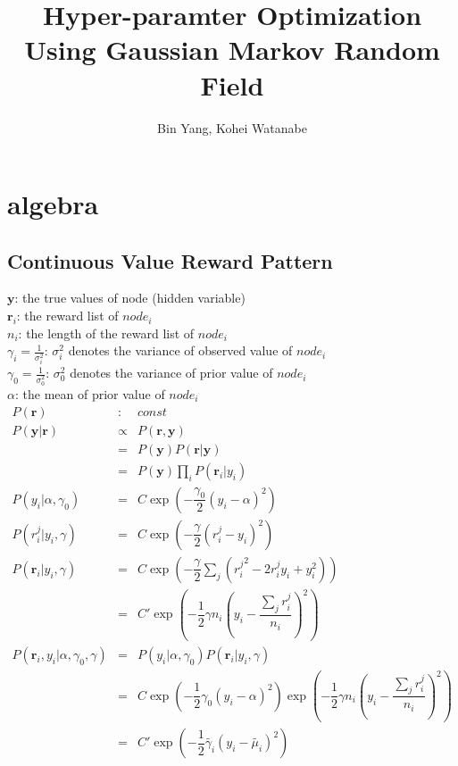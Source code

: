 \documentclass[platex, a4paper]{jsarticle}
\begin{document}
\title{Hyper-paramter Optimization \\ Using Gaussian Markov Random Field}
\author{Bin Yang, Kohei Watanabe}
\maketitle

\section{algebra}

\subsection{Continuous Value Reward Pattern}

$\bm{y}$: the true values of node (hidden variable) \\
$\bm{r}_i$: the reward list of $node_i$ \\
$n_i$: the length of the reward list of $node_i$ \\
$\gamma_i=\frac{1}{\sigma_i^2}$: $\sigma_i^2$ denotes the variance of observed value of $node_i$ \\
$\gamma_0=\frac{1}{\sigma_0^2}$: $\sigma_0^2$ denotes the variance of prior value of $node_i$ \\
$\alpha$: the mean of prior value of $node_i$ \\

\begin{eqnarray}
  P(\bm{r}) &:& const \\
  P\left( \bm{y} |\bm{r}\right) &\propto&  P\left( \bm{r} ,\bm{y}\right) \\
    &=& P\left( \bm{y} \right) P\left( \bm{r} |\bm{y}\right) \\
    &=& P\left( \bm{y} \right) \prod_i P\left( \bm{r}_i |y_i \right) \\
  P\left( y_{i} | \alpha, \gamma_0 \right) &=& C\exp \left( -\dfrac {\gamma_0} {2} \left( y_{i}-\alpha \right) ^{2}\right) \\
  P(r_{i}^{j} | y_{i}, \gamma) &=& C\exp \left( -\dfrac {\gamma} {2}\left( r_{i}^{j}-y_{i}\right) ^{2}\right) \\
  P\left( \bm{r}_i | y_i, \gamma \right) &=& C\exp \left( -\dfrac {\gamma} {2}\sum _{j}\left( {r_{i}^{j}}^2-2r_{i}^{j}y_{i}+y_{i}^{2}\right) \right) \\
    &=& C'\exp \left( -\dfrac {1} {2}\gamma n_{i}\left( y_{i}-\dfrac {\sum _{j}r_{i}^{j}} {n_{i}}\right) ^{2}\right) \\
  P\left( \bm{r}_i ,y_i | \alpha, \gamma_0, \gamma \right) &=& P\left( y_i | \alpha, \gamma_0 \right) P\left( \bm{r}_i | y_i, \gamma \right) \\
    &=& C\exp \left( -\dfrac {1} {2} \gamma_0 \left( y_{i}-\alpha \right) ^{2}\right)
    \exp \left( -\dfrac {1} {2}\gamma n_{i}\left( y_{i}-\dfrac {\sum _{j}r_{i}^{j}} {n_{i}}\right) ^{2}\right) \\
    &=& C'\exp \left( - \dfrac {1} {2} \tilde{\gamma_i} \left( y_{i} - \tilde {\mu_i} \right) ^{2}  \right)
\end{eqnarray}
\end{document}
